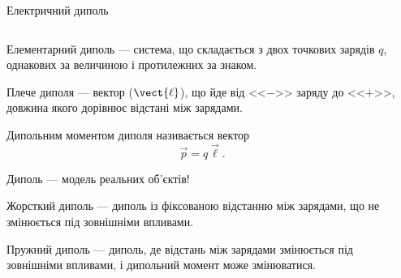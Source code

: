 \documentclass{beamer}
\begin{document}
\begin{frame}{Електричний диполь}{}
	\begin{columns}
		\begin{column}{0.7\linewidth}
				\begin{block}{}\justifying\small
					\alert{Елементарний диполь} --- система, що складається з
					двох точкових зарядів $q$, однакових за величиною і
					протилежних за знаком.

					\medskip

					\alert{Плече диполя} --- вектор ($\vect{\ell}$), що йде від <<$-$>> заряду до
					<<$+$>>, довжина якого дорівнює відстані між зарядами.

					\medskip

					\alert{Дипольним моментом} диполя називається вектор
					\begin{equation*}
						\vec{p} = q\vec{\ell}.
					\end{equation*}
				\end{block}
				\begin{alertblock}{}\centering
					Диполь --- модель реальних об'єктів!
				\end{alertblock}

				\begin{block}{}\justifying\small
					\alert{Жорсткий диполь} --- диполь із фіксованою відстанню між зарядами, що не
					змінюється під зовнішніми впливами.

					\medskip

					\alert{Пружний диполь} --- диполь, де відстань між зарядами змінюється під зовнішніми
					впливами, і дипольний момент може змінюватися.
				\end{block}
		\end{column}
		\begin{column}{0.3\linewidth}\centering
			
		\end{column}
	\end{columns}
\end{frame}
\end{document}
